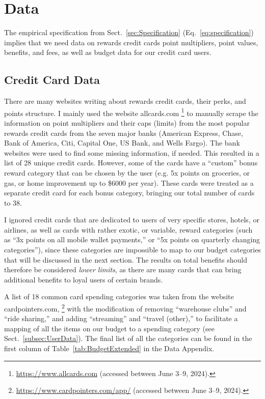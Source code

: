 \section{Data} \label{sec:Data}

The empirical specification from Sect.~\ref{sec:Specification} (Eq.~\ref{eq:specification}) implies that we need data on rewards credit cards point multipliers, point values, benefits, and fees, as well as budget data for our credit card users.

\subsection{Credit Card Data} \label{subsec:CreditCardData}

There are many websites writing about rewards credit cards, their perks, and points structure. 
I mainly used the website allcards.com%
\footnote{\url{https://www.allcards.com} (accessed between June 3--9, 2024).}
to manually scrape the information on point multipliers and their caps (limits) from the most popular rewards credit cards from the seven major banks (American Express, Chase, Bank of America, Citi, Capital One, US Bank, and Wells Fargo). 
The bank websites were used to find some missing information, if needed. 
This resulted in a list of 28 unique credit cards. 
However, some of the cards have a ``custom'' bonus reward category that can be chosen by the user (e.g. 5x points on groceries, or gas, or home improvement up to \$6000 per year). 
These cards were treated as a separate credit card for each bonus category, bringing our total number of cards to 38. 

I ignored credit cards that are dedicated to users of very specific stores, hotels, or airlines, as well as cards with rather exotic, or variable, reward categories (such as ``3x points on all mobile wallet payments,'' or ``5x points on quarterly changing categories''), since these categories are impossible to map to our budget categories that will be discussed in the next section. 
The results on total benefits should therefore be considered \emph{lower limits}, as there are many cards that can bring additional benefits to loyal users of certain brands.
 
A list of 18 common card spending categories was taken from the website cardpointers.com,%
\footnote{\url{https://www.cardpointers.com/app/} (accessed between June 3--9, 2024).}
with the modification of removing ``warehouse clubs'' and ``ride sharing,'' and adding ``streaming'' and ``travel (other),'' to facilitate a mapping of all the items on our budget to a spending category (see Sect.~\ref{subsec:UserData}). The final list of all the categories can be found in the first column of Table~\ref{tab:BudgetExtended} in the Data Appendix.

